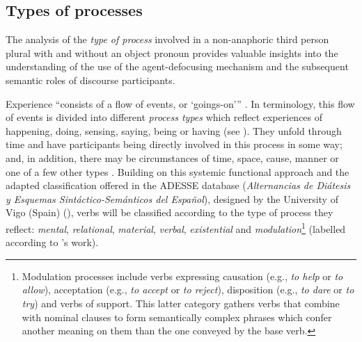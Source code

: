 \documentclass[output=paper]{langscibook}
\begin{document}
\subsection{Types of processes}\label{sec:pierre:4.1}

The analysis of the \textit{type of process} involved in a non-anaphoric third person plural with and without an object pronoun provides valuable insights into the understanding of the use of the agent-defocusing mechanism and the subsequent semantic roles of discourse participants.


Experience “consists of a flow of events, or ‘goings-on’” \citep[170]{HallidayMatthiessen2014}. In  terminology, this flow of events is divided into different \textit{process types} which reflect experiences of happening, doing, sensing, saying, being or having (see \citealt{HallidayMatthiessen1999}). They unfold through time and have participants being directly involved in this process in some way; and, in addition, there may be circumstances of time, space, cause, manner or one of a few other types \citep[170]{HallidayMatthiessen2014}. Building on this systemic functional approach and the adapted classification offered in the ADESSE database (\textit{Alternancias de Diátesis y Esquemas Sintáctico-Semánticos del Español}), designed by the University of Vigo (Spain) (\citealt{García-MiguelAlbertuz2005}), verbs will be classified according to the type of process they reflect: \textit{mental}, \textit{relational}, \textit{material}, \textit{verbal}, \textit{existential} and \textit{modulation}\footnote{Modulation processes include verbs expressing causation (e.g., \textit{to help} or \textit{to allow}), acceptation (e.g., \textit{to accept} or \textit{to reject}), disposition (e.g., \textit{to dare} or \textit{to try}) and verbs of support. This latter category gathers verbs that combine with nominal clauses to form semantically complex phrases which confer another meaning on them than the one conveyed by the base verb.} (labelled according to \citealt{García-MiguelAlbertuz2005}’s work). 
\end{document}
